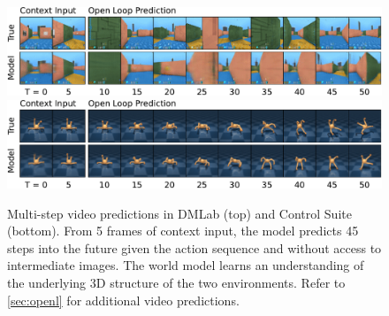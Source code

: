\begin{figure}[t]
\centering
\includegraphics[width=1\linewidth,trim={0 .5cm 0 0},clip]{openl/dmlab} \\[.5ex]
\includegraphics[width=1\linewidth,trim={0 0 0 .5cm},clip]{openl/quad}
\caption{Multi-step video predictions in DMLab (top) and Control Suite (bottom). From 5 frames of context input, the model predicts 45 steps into the future given the action sequence and without access to intermediate images. The world model learns an understanding of the underlying 3D structure of the two environments. Refer to \cref{sec:openl} for additional video predictions.}
\label{fig:openl}
\end{figure}
